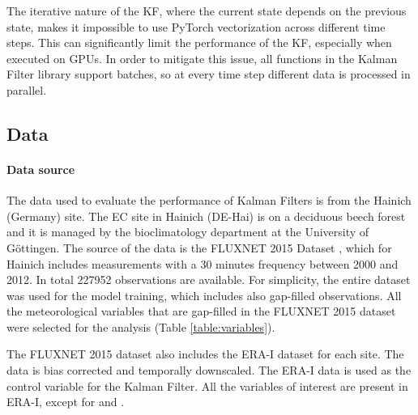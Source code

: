 \documentclass{article}
\let\Oldsubsection\subsection
\renewcommand{\subsection}{\FloatBarrier\Oldsubsection}
\begin{document}
The iterative nature of the KF, where the current state depends on the previous state, makes it impossible to use \textsf{PyTorch} vectorization across different time steps. This can significantly limit the performance of the KF, especially when executed on GPUs. In order to  mitigate this issue, all functions in the Kalman Filter library support batches, so at every time step different data is processed in parallel.


\subsection{Data}

\paragraph{Data source} The data used to evaluate the performance of Kalman Filters is from the Hainich (Germany) site. The EC site in Hainich (DE-Hai) is on a deciduous beech forest and it is managed by the bioclimatology department at the  University of Göttingen. The source of the data is  the FLUXNET 2015 Dataset \cite{pastorello_fluxnet2015_2020}, which for Hainich includes measurements with a 30 minutes frequency between 2000 and 2012. In total 227952 observations are available. For simplicity, the entire dataset was used for the model training, which includes also gap-filled observations.
All the meteorological variables that are gap-filled in the FLUXNET 2015 dataset were selected for the analysis (Table \ref{table:variables}).

The FLUXNET 2015 dataset also includes the ERA-I dataset for each site. The data is bias corrected and temporally downscaled.
The ERA-I data is used as the control variable for the Kalman Filter. All the variables of interest are present in ERA-I, except for  and .
\end{document}
